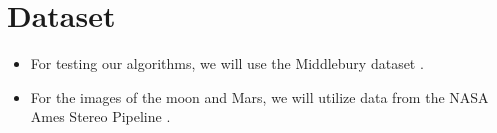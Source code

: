 \documentclass[10pt,twocolumn,letterpaper]{article}
\begin{document}
\section{Dataset}
\begin{itemize}
    \item For testing our algorithms, we will use the Middlebury dataset \cite{VisionMiddleburyEdu}.
    \item For the images of the moon and Mars, we will utilize data from the NASA Ames Stereo Pipeline \cite{beyerAmesStereoPipeline2018}.
\end{itemize}

{\small

\printbibliography
}
\end{document}
